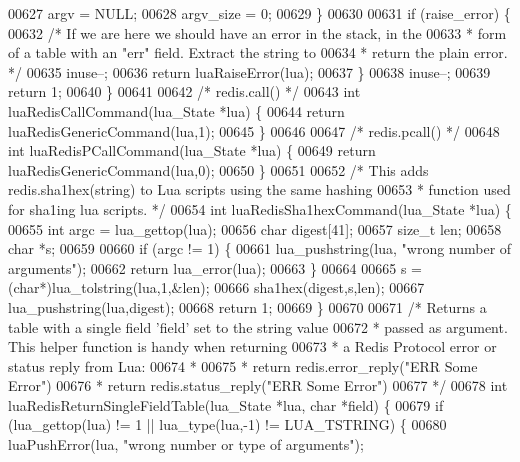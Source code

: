 \begin{DoxyCode}
{{{{{{{00627         argv = NULL;
00628         argv\_size = 0;
00629     \}
00630 
00631     \textcolor{keywordflow}{if} (raise\_error) \{
00632         \textcolor{comment}{/* If we are here we should have an error in the stack, in the}
00633 \textcolor{comment}{         * form of a table with an "err" field. Extract the string to}
00634 \textcolor{comment}{         * return the plain error. */}
00635         inuse--;
00636         \textcolor{keywordflow}{return} luaRaiseError(lua);
00637     \}
00638     inuse--;
00639     \textcolor{keywordflow}{return} 1;
00640 \}
00641 
00642 \textcolor{comment}{/* redis.call() */}
00643 \textcolor{keywordtype}{int} luaRedisCallCommand(lua\_State *lua) \{
00644     \textcolor{keywordflow}{return} luaRedisGenericCommand(lua,1);
00645 \}
00646 
00647 \textcolor{comment}{/* redis.pcall() */}
00648 \textcolor{keywordtype}{int} luaRedisPCallCommand(lua\_State *lua) \{
00649     \textcolor{keywordflow}{return} luaRedisGenericCommand(lua,0);
00650 \}
00651 
00652 \textcolor{comment}{/* This adds redis.sha1hex(string) to Lua scripts using the same hashing}
00653 \textcolor{comment}{ * function used for sha1ing lua scripts. */}
00654 \textcolor{keywordtype}{int} luaRedisSha1hexCommand(lua\_State *lua) \{
00655     \textcolor{keywordtype}{int} argc = lua\_gettop(lua);
00656     \textcolor{keywordtype}{char} digest[41];
00657     size\_t len;
00658     \textcolor{keywordtype}{char} *s;
00659 
00660     \textcolor{keywordflow}{if} (argc != 1) \{
00661         lua\_pushstring(lua, \textcolor{stringliteral}{"wrong number of arguments"});
00662         \textcolor{keywordflow}{return} lua\_error(lua);
00663     \}
00664 
00665     s = (\textcolor{keywordtype}{char}*)lua\_tolstring(lua,1,&len);
00666     sha1hex(digest,s,len);
00667     lua\_pushstring(lua,digest);
00668     \textcolor{keywordflow}{return} 1;
00669 \}
00670 
00671 \textcolor{comment}{/* Returns a table with a single field 'field' set to the string value}
00672 \textcolor{comment}{ * passed as argument. This helper function is handy when returning}
00673 \textcolor{comment}{ * a Redis Protocol error or status reply from Lua:}
00674 \textcolor{comment}{ *}
00675 \textcolor{comment}{ * return redis.error\_reply("ERR Some Error")}
00676 \textcolor{comment}{ * return redis.status\_reply("ERR Some Error")}
00677 \textcolor{comment}{ */}
00678 \textcolor{keywordtype}{int} luaRedisReturnSingleFieldTable(lua\_State *lua, \textcolor{keywordtype}{char} *field) \{
00679     \textcolor{keywordflow}{if} (lua\_gettop(lua) != 1 || lua\_type(lua,-1) != LUA\_TSTRING) \{
00680         luaPushError(lua, \textcolor{stringliteral}{"wrong number or type of arguments"});
}}}}}}}
\end{DoxyCode}
